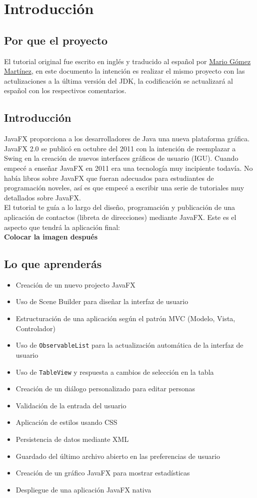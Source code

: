 \chapter*{Introducción}
\section*{Por que el proyecto}
El tutorial original fue escrito en inglés y traducido al español por \textcolor{azul}{\href{https://about.me/magomar}{Mario Gómez Martínez}}, en este documento la intención es realizar el mismo proyecto con las actulizaciones a la última versión del JDK, la codificación se actualizará al español con los respectivos comentarios. 
\section*{Introducción}
JavaFX proporciona a los desarrolladores de Java una nueva plataforma gráfica. JavaFX 2.0 se publicó en octubre del 2011 con la intención de reemplazar a Swing en la creación de nuevos interfaces gráficos de usuario (IGU). Cuando empecé a enseñar JavaFX en 2011 era una tecnología muy incipiente todavía. No había libros sobre JavaFX que fueran adecuados para estudiantes de programación noveles, así es que empecé a escribir una serie de tutoriales muy detallados sobre JavaFX.\\
El tutorial te guía a lo largo del diseño, programación y publicación de una aplicación de contactos (libreta de direcciones) mediante JavaFX. Este es el aspecto que tendrá la aplicación final:\\
\textbf{Colocar la imagen después}\\
\section*{Lo que aprenderás}
\begin{itemize}
	\item Creación de un nuevo projecto JavaFX
	\item Uso de Scene Builder para diseñar la interfaz de usuario
	\item Estructuración de una aplicación según el patrón MVC (Modelo, Vista, Controlador)
	\item Uso de \textcolor{codigo}{\texttt{ObservableList}} para la actualización automática de la interfaz de usuario
	\item Uso de \textcolor{codigo}{\texttt{TableView}} y respuesta a cambios de selección en la tabla
	\item Creación de un diálogo personalizado para editar personas
	\item Validación de la entrada del usuario
	\item Aplicación de estilos usando CSS
	\item Persistencia de datos mediante XML
	\item Guardado del último archivo abierto en las preferencias de usuario
	\item Creación de un gráfico JavaFX para mostrar estadísticas
	\item Despliegue de una aplicación JavaFX nativa
\end{itemize}

